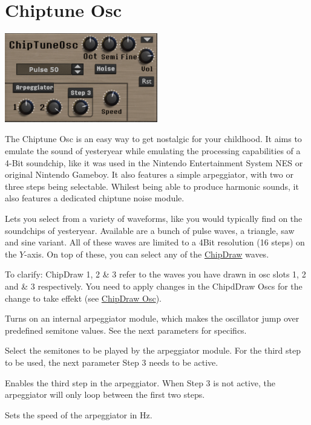\section{Chiptune Osc}
\begin{center}
    \includegraphics[width=0.5\textwidth]{graphics/chiptune_osc.png}
\end{center}
The Chiptune Osc is an easy way to get nostalgic for your childhood. It aims to emulate the sound of yesteryear while emulating the processing capabilities of a 4-Bit soundchip, like it was used in the Nintendo Entertainment System NES or original Nintendo Gameboy. It also features a simple arpeggiator, with two or three steps being selectable. Whilest being able to produce harmonic sounds, it also features a dedicated chiptune noise module.

Lets you select from a variety of waveforms, like you would typically find on the soundchips of yesteryear. Available are a bunch of pulse waves, a triangle, saw and sine variant. All of these waves are limited to a 4Bit resolution (16 steps) on the $Y$-axis. On top of these, you can select any of the \hyperref[chipdraw]{ChipDraw} waves.

To clarify: ChipDraw 1, 2 \& 3 refer to the waves you have drawn in osc slots 1, 2 and \& 3 respectively. You need to apply changes in the ChipdDraw Oscs for the change to take effekt (see \hyperref[chipdraw]{ChipDraw Osc}).

Turns on an internal arpeggiator module, which makes the oscillator jump over predefined semitone values. See the next parameters for specifics.

Select the semitones to be played by the arpeggiator module. For the third step to be used, the next parameter Step 3 needs to be active.

Enables the third step in the arpeggiator. When Step 3 is not active, the arpeggiator will only loop between the first two steps.

Sets the speed of the arpeggiator in Hz.

